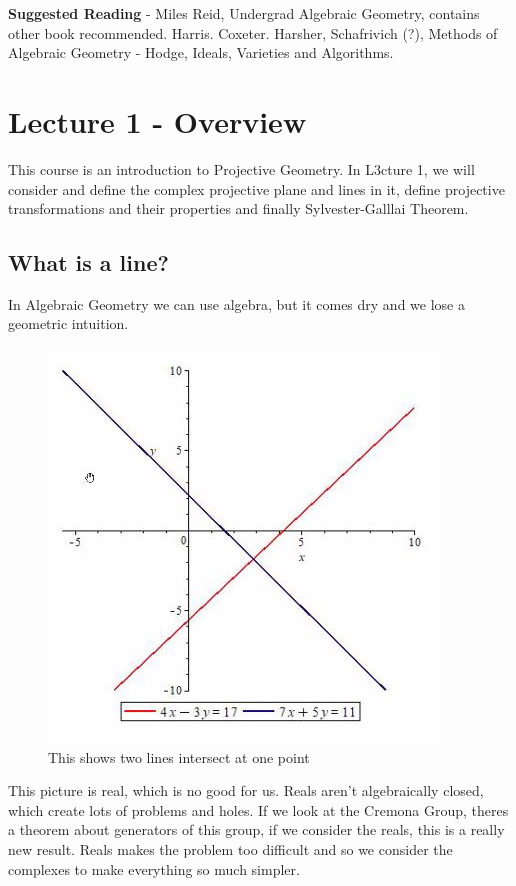 \documentclass{article}
\begin{document}
  \maketitle

\textbf{Suggested Reading} - Miles Reid, Undergrad Algebraic Geometry, contains other book recommended. Harris. Coxeter. Harsher, Schafrivich (?), Methods of Algebraic Geometry - Hodge, Ideals, Varieties and Algorithms.\\

\section{Lecture 1 - Overview}
This course is an introduction to Projective Geometry. In L3cture 1, we will consider and define the complex projective plane and lines in it, define projective transformations and their properties and finally Sylvester-Galllai Theorem.

\subsection{What is a line?}
In Algebraic Geometry we can use algebra, but it comes dry and we lose a geometric intuition.
\begin{figure}[!ht]
\centering
\includegraphics{./figures/L1.1}
\caption{This shows two lines intersect at one point}
\end{figure}

This picture is real, which is no good for us. Reals aren't algebraically closed, which create lots of problems and holes. If we look at the Cremona Group, theres a theorem about generators of this group, if we consider the reals, this is a really new result. Reals makes the problem too difficult and so we consider the complexes to make everything so much simpler.\\
\end{document}
